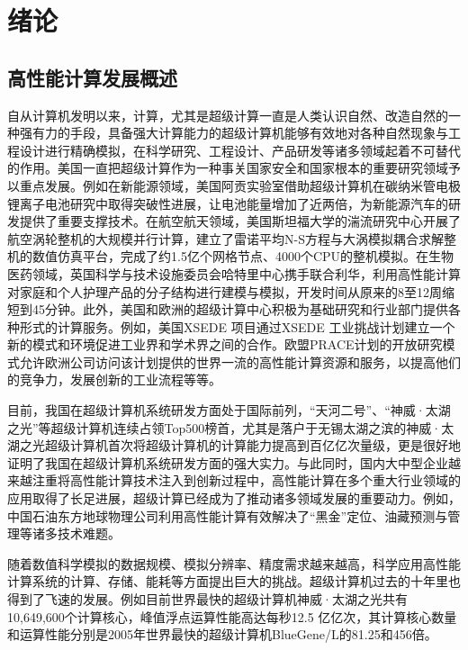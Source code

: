 
\chapter{绪论}

\section{高性能计算发展概述}

自从计算机发明以来，计算，尤其是超级计算一直是人类认识自然、改造自然的一种强有力的手段，具备强大计算能力的超级计算机能够有效地对各种自然现象与工程设计进行精确模拟，在科学研究、工程设计、产品研发等诸多领域起着不可替代的作用。美国一直把超级计算作为一种事关国家安全和国家根本的重要研究领域予以重点发展。例如在新能源领域，美国阿贡实验室借助超级计算机在碳纳米管电极锂离子电池研究中取得突破性进展，让电池能量增加了近两倍，为新能源汽车的研发提供了重要支撑技术\cite{xiong2012self}。在航空航天领域，美国斯坦福大学的湍流研究中心开展了航空涡轮整机的大规模并行计算，建立了雷诺平均N-S方程与大涡模拟耦合求解整机的数值仿真平台，完成了约1.5亿个网格节点、4000个CPU的整机模拟\cite{reynolds2003aircraft}。在生物医药领域，英国科学与技术设施委员会哈特里中心携手联合利华，利用高性能计算对家庭和个人护理产品的分子结构进行建模与模拟，开发时间从原来的8至12周缩短到45分钟\cite{Unilever}。此外，美国和欧洲的超级计算中心积极为基础研究和行业部门提供各种形式的计算服务。例如，美国XSEDE 项目通过XSEDE 工业挑战计划建立一个新的模式和环境促进工业界和学术界之间的合作\cite{Unilever}。欧盟PRACE计划的开放研究模式允许欧洲公司访问该计划提供的世界一流的高性能计算资源和服务\cite{PRACE}，以提高他们的竞争力，发展创新的工业流程等等。

目前，我国在超级计算机系统研发方面处于国际前列，“天河二号”\cite{tianhe-2}、“神威·太湖之光”\cite{fu2016sunway}等超级计算机连续占领Top500榜首，尤其是落户于无锡太湖之滨的神威·太湖之光超级计算机首次将超级计算机的计算能力提高到百亿亿次量级\cite{fu2016sunway}，更是很好地证明了我国在超级计算机系统研发方面的强大实力。与此同时，国内大中型企业越来越注重将高性能计算技术注入到创新过程中，高性能计算在多个重大行业领域的应用取得了长足进展，超级计算已经成为了推动诸多领域发展的重要动力。例如，中国石油东方地球物理公司利用高性能计算有效解决了“黑金”定位、油藏预测与管理等诸多技术难题\cite{luo2007hpc}。

随着数值科学模拟的数据规模、模拟分辨率、精度需求越来越高，科学应用高性能计算系统的计算、存储、能耗等方面提出巨大的挑战。超级计算机过去的十年里也得到了飞速的发展。例如目前世界最快的超级计算机神威·太湖之光共有10,649,600个计算核心，峰值浮点运算性能高达每秒12.5 亿亿次，其计算核心数量和运算性能分别是2005年世界最快的超级计算机BlueGene/L的81.25和456倍\cite{top5002015}。

